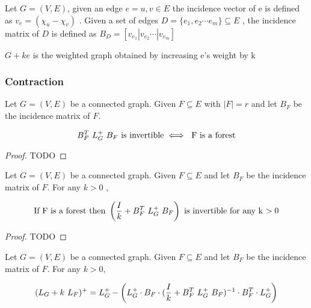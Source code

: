 \begin{HXd}
Let $G = (V,E)$, given an edge $e = {u,v} \in E$ the incidence vector of e is defined as $v_e = (\chi_u - \chi_v)$ . Given a set of edges $D = \{e_1, e_2 \cdots e_m\} \subseteq E$ , the incidence matrix of $D$ is defined as $B_D = [v_{e_1} | v_{e_2} \cdots | v_{e_m}]$  
\end{HXd}

\begin{HXd}[$G + ke$]
 $G + ke$ is the weighted graph obtained by increasing e's weight by k
\end{HXd}



\subsubsection{Contraction}

\begin{HXl}
 Let $G = (V, E)$ be a connected graph. Given $F \subseteq E$ with $|F| = r$ and let $B_F$ be the incidence matrix of $F$.
 
 $$ B_F^T \ L_{G}^{+} \ B_F \ \text{is invertible} \iff \text{ F is a forest} $$
\end{HXl}

\begin{proof}
 TODO
\end{proof}


\begin{HXl}
 Let $G = (V, E)$ be a connected graph. Given $F \subseteq E$ and let $B_F$ be the incidence matrix of $F$. For any $k > 0$ , 
 
 $$\text{If F is a forest then } \left( \frac{I}{k} +  B_F^T \ L_{G}^{+} \ B_F \right) \ \text{is invertible for any k $> 0$}$$
\end{HXl}

\begin{proof}
 TODO
\end{proof}

\begin{HXt}
 Let $G = (V, E)$ be a connected graph. Given $F \subseteq E$ and let $B_F$ be the incidence matrix of $F$. For any $k > 0$,
 
 $$ (L_G + k \ L_F)^+ = \laplacian - \left(\laplacian \cdot B_F \cdot (\frac{I}{k} + B_F^T \ \laplacian \ B_F)^{-1} \cdot B_F^T \cdot \laplacian \right)$$
 
\end{HXt}

